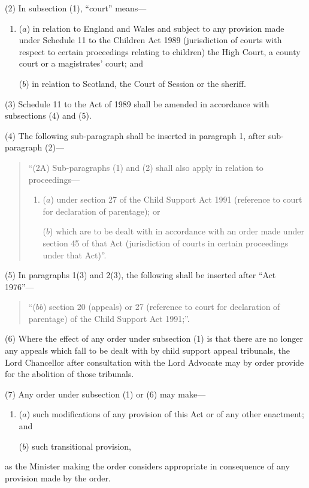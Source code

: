 \documentclass[12pt,a4paper]{article}
\begin{document}
(2) In subsection (1), “court” means—
\begin{enumerate}\item[]
($a$) in relation to England and Wales and subject to any provision made under Schedule 11 to the Children Act 1989 (jurisdiction of courts with respect to certain proceedings relating to children) the High Court, a county court or a magistrates' court; and

($b$) in relation to Scotland, the Court of Session or the sheriff.
\end{enumerate}

(3) Schedule 11 to the Act of 1989 shall be amended in accordance with subsections (4)  and (5).

(4) The following sub-paragraph shall be inserted in paragraph 1, after sub-paragraph (2)—
\begin{quotation}
“(2A) Sub-paragraphs (1)  and (2)  shall also apply in relation to proceedings—
\begin{enumerate}\item[]
($a$) under section 27 of the Child Support Act 1991 (reference to court for declaration of parentage); or

($b$) which are to be dealt with in accordance with an order made under section 45 of that Act (jurisdiction of courts in certain proceedings under that Act)”.
\end{enumerate}
\end{quotation}

(5) In paragraphs 1(3)  and 2(3), the following shall be inserted after “Act 1976”—
\begin{quotation}
“($bb$) section 20 (appeals) or 27 (reference to court for declaration of parentage) of the Child Support Act 1991;”.
\end{quotation}

(6) Where the effect of any order under subsection (1)  is that there are no longer any appeals which fall to be dealt with by child support appeal tribunals, the Lord Chancellor after consultation with the Lord Advocate may by order provide for the abolition of those tribunals.

(7) Any order under subsection (1)  or (6)  may make—
\begin{enumerate}\item[]
($a$) such modifications of any provision of this Act or of any other enactment; and

($b$) such transitional provision,
\end{enumerate}
as the Minister making the order considers appropriate in consequence of any provision made by the order.
\end{document}
